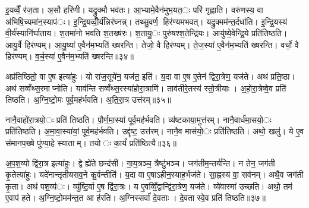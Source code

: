
इ॒यव्वैँ॒ र॑ज॒ता। अ॒सौ हरि॑णी। यद्रु॒क्मौ भव॑तः। आ॒भ्यामे॒वैन॑मुभ॒यत॒ः परि॑ गृह्णाति। वरु॑णस्य॒ वा अ॑भिषि॒च्यमा॑न॒स्याप॑ः। इ॒न्द्रि॒यव्वीँ॒र्य॑न्निर॑घ्नन्न्। तथ्सु॒वर्ण॒ हिर॑ण्यमभवत्। यद्रु॒क्मम॑न्त॒र्दधा॑ति। इ॒न्द्रि॒यस्य॑ वी॒र्य॑स्यानि॑र्घाताय। श॒तमा॑नो भवति श॒तख्ष॑रः। श॒तायु॒ः पुरु॑षश्श॒तेन्द्रि॑यः। आयु॑ष्ये॒वेन्द्रि॒ये प्रति॑तिष्ठति। आयु॒र्वै हिर॑ण्यम्। आ॒यु॒ष्या॑ ए॒वैन॑म॒भ्यति॑ ख्षरन्ति। तेजो॒ वै हिर॑ण्यम्। ते॒ज॒स्या॑ ए॒वैन॑म॒भ्यति॑ ख्षरन्ति। वर्चो॒ वै हिर॑ण्यम्। व॒र्च॒स्या॑ ए॒वैन॑म॒भ्यति॑ ख्षरन्ति॥३४॥


अप्र॑तिष्ठितो॒ वा ए॒ष इत्या॑हुः। यो रा॑ज॒सूये॑न॒ यज॑त॒ इति॑। य॒दा वा ए॒ष ए॒तेन॑ द्विरा॒त्रेण॒ यज॑ते। अथ॑ प्रति॒ष्ठा। अथ॑ सव्वँथ्स॒रमाप्नोति। याव॑न्ति सव्वँथ्स॒रस्या॑होरा॒त्राणि॑। ताव॑तीरे॒तस्य॑ स्तो॒त्रीयाः। अ॒हो॒रा॒त्रेष्वे॒व प्रति॑ तिष्ठति। अ॒ग्नि॒ष्टो॒मः पूर्व॒मह॑र्भवति। अ॒ति॒रा॒त्र उत्त॑रम्॥३५॥

नानै॒वाहो॑रा॒त्रयो॒ः प्रति॑ तिष्ठति। पौ॒र्ण॒मा॒स्यां पूर्व॒मह॑र्भवति। व्य॑ष्टकाया॒मुत्त॑रम्। नानै॒वार्ध॑मा॒सयो॒ः प्रति॑तिष्ठति। अ॒मा॒वा॒स्या॑यां॒ पूर्व॒मह॑र्भवति। उद्दृ॑ष्ट॒ उत्त॑रम्। नानै॒व मास॑यो॒ः प्रति॑तिष्ठति। अथो॒ खलु॑। ये ए॒व स॑मानप॒ख्षे पु॑ण्या॒हे स्याताम्। तयोः का॒र्यं॑ प्रति॑ष्ठित्यै॥३६॥

अ॒प॒श॒व्यो द्वि॑रा॒त्र इत्या॑हुः। द्वे ह्ये॑ते छन्द॑सी। गा॒य॒त्रञ्च॒ त्रैष्टु॑भञ्च। जग॑तीम॒न्तर्य॑न्ति। न तेन॒ जग॑ती कृ॒तेत्या॑हुः। यदे॑नान्तृतीयसव॒ने कु॒र्वन्तीति॑। य॒दा वा ए॒षाऽहीन॒स्याह॒र्भज॑ते। सा॒ह्नस्य॑ वा॒ सव॑नम्। अथै॒व जग॑ती कृ॒ता। अथ॑ पश॒व्य॑ः। व्यु॑ष्टि॒र्वा ए॒ष द्वि॑रा॒त्रः। य ए॒वव्विँ॒द्वान्द्वि॑रा॒त्रेण॒ यज॑ते। व्ये॑वास्मा॑ उच्छति। अथो॒ तम॑ ए॒वाप॑ हते। अ॒ग्नि॒ष्टो॒मम॑न्त॒त आ ह॑रति। अ॒ग्निस्सर्वा॑ दे॒वताः। दे॒वतास्वे॒व प्रति॑ तिष्ठति॥३७॥





